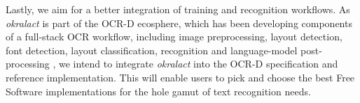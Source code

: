 \documentclass[sigconf]{acmart}
\begin{document}



Lastly, we aim for a better integration of training and
recognition workflows. As \textit{okralact} is part of the OCR-D
ecosphere, which has been developing components of a full-stack
OCR workflow, including image preprocessing, layout detection, font
detection, layout classification, recognition and language-model
post-processing \cite{englmaier2019datech}, we intend to integrate \textit{okralact} into the
OCR-D specification and reference implementation. This will enable
users to pick and choose the best Free Software implementations for
the hole gamut of text recognition needs.




%
%
%



\end{document}

